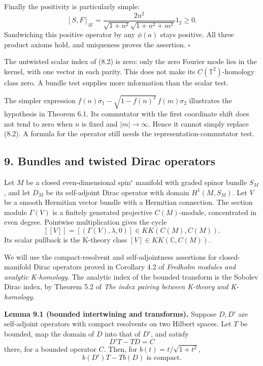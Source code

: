 \documentclass[
  11pt,
]{article}
\begin{document}
Finally the positivity is particularly simple: \[
[S,F]_{\mathrm{gr}}
=\frac{2n^2}{\sqrt{1+n^2}\sqrt{1+n^2+m^2}}1_2\geq0.
\tag{8.5}
\] Sandwiching this positive operator by any \(\phi(a)\) stays positive.
All three product axioms hold, and uniqueness proves the assertion.
\(\square\)

The untwisted scalar index of (8.2) is zero: only the zero Fourier mode
lies in the kernel, with one vector in each parity. This does not make
its \(C(\mathbb T^2)\)-homology class zero. A bundle test supplies more
information than the scalar test.

The simpler expression \(f(n)\sigma_1-
\sqrt{1-f(n)^2}\,f(m)\sigma_2\) illustrates the hypothesis in Theorem
6.1. Its commutator with the first coordinate shift does not tend to
zero when \(n\) is fixed and \(|m|\to\infty\). Hence it cannot simply
replace (8.2). A formula for the operator still needs the
representation-commutator test.

\subsection{9. Bundles and twisted Dirac
operators}\label{bundles-and-twisted-dirac-operators}

Let \(M\) be a closed even-dimensional spin\(^{c}\) manifold with graded
spinor bundle \(S_M\), and let \(D_M\) be its self-adjoint Dirac
operator with domain \(H^1(M,S_M)\). Let \(V\) be a smooth Hermitian
vector bundle with a Hermitian connection. The section module
\(\Gamma(V)\) is a finitely generated projective \(C(M)\)-module,
concentrated in even degree. Pointwise multiplication gives the cycle \[
[[V]]=[(\Gamma(V),\lambda,0)]\in KK(C(M),C(M)).
\] Its scalar pullback is the K-theory class
\([V]\in KK(\mathbb C,C(M))\).

We will use the compact-resolvent and self-adjointness assertions for
closed-manifold Dirac operators proved in Corollary 4.2 of
\emph{Fredholm modules and analytic K-homology}. The analytic index of
the bounded transform is the Sobolev Dirac index, by Theorem 5.2 of
\emph{The index pairing between K-theory and K-homology}.

\textbf{Lemma 9.1 (bounded intertwining and transforms).} Suppose
\(D,D'\) are self-adjoint operators with compact resolvents on two
Hilbert spaces. Let \(T\) be bounded, map the domain of \(D\) into that
of \(D'\), and satisfy \[
D'T-TD=C
\] there, for a bounded operator \(C\). Then, for
\(b(t)=t/\sqrt{1+t^2}\), \[
b(D')T-Tb(D)\text{ is compact}.
\tag{9.1}
\]
\end{document}
